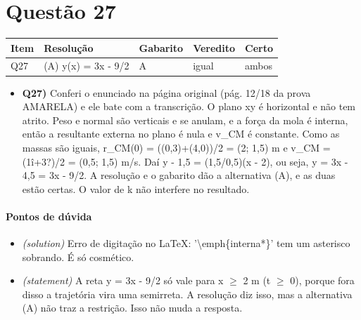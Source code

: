 \documentclass{article}%
\begin{document}
\section*{Questão 27}%
\begin{longtable}{@{}p{} p{} p{} p{} p{}@{}}\toprule Item & Resolução & Gabarito & Veredito & Certo \\ \midrule
Q27 & (A) y(x) = 3x - 9/2 & A & igual & ambos \\
\bottomrule\end{longtable}%
\begin{itemize}%
\item%
\textbf{Q27)} Conferi o enunciado na página original (pág. 12/18 da prova AMARELA) e ele bate com a transcrição. O plano xy é horizontal e não tem atrito. Peso e normal são verticais e se anulam, e a força da mola é interna, então a resultante externa no plano é nula e v\_CM é constante. Como as massas são iguais, r\_CM(0) = ((0,3)+(4,0))/2 = (2; 1,5) m e v\_CM = (1î+3?)/2 = (0,5; 1,5) m/s. Daí y - 1,5 = (1,5/0,5)(x - 2), ou seja, y = 3x - 4,5 = 3x - 9/2. A resolução e o gabarito dão a alternativa (A), e as duas estão certas. O valor de k não interfere no resultado.%
\end{itemize}%
\paragraph{Pontos de dúvida}%
\begin{itemize}%
\item%
\textit{(solution)} Erro de digitação no LaTeX: '\textbackslash{}emph\{interna*\}' tem um asterisco sobrando. É só cosmético.%
\item%
\textit{(statement)} A reta y = 3x - 9/2 só vale para x $\geq$ 2 m (t $\geq$ 0), porque fora disso a trajetória vira uma semirreta. A resolução diz isso, mas a alternativa (A) não traz a restrição. Isso não muda a resposta.%
\end{itemize}%
\end{document}
